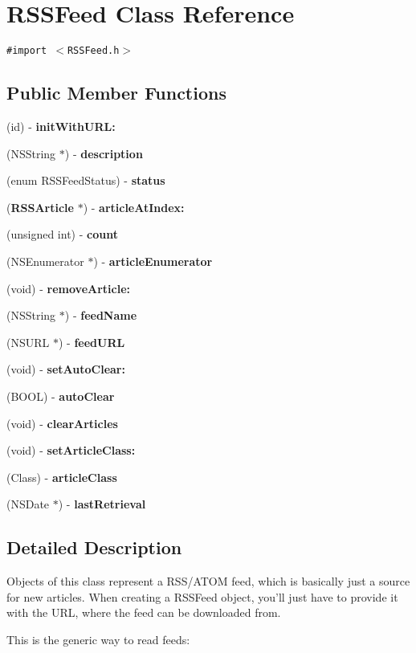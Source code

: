 \section{RSSFeed Class Reference}
\label{interfaceRSSFeed}
{\tt \#import $<$RSSFeed.h$>$}

\subsection*{Public Member Functions}
\begin{CompactItemize}
\item 
(id) - {\bf init\-With\-URL:}
\item 
(NSString $\ast$) - {\bf description}
\item 
(enum RSSFeed\-Status) - {\bf status}
\item 
({\bf RSSArticle} $\ast$) - {\bf article\-At\-Index:}
\item 
(unsigned int) - {\bf count}
\item 
(NSEnumerator $\ast$) - {\bf article\-Enumerator}
\item 
(void) - {\bf remove\-Article:}
\item 
(NSString $\ast$) - {\bf feed\-Name}
\item 
(NSURL $\ast$) - {\bf feed\-URL}
\item 
(void) - {\bf set\-Auto\-Clear:}
\item 
(BOOL) - {\bf auto\-Clear}
\item 
(void) - {\bf clear\-Articles}
\item 
(void) - {\bf set\-Article\-Class:}
\item 
(Class) - {\bf article\-Class}
\item 
(NSDate $\ast$) - {\bf last\-Retrieval}
\end{CompactItemize}


\subsection{Detailed Description}
Objects of this class represent a RSS/ATOM feed, which is basically just a source for new articles. When creating a RSSFeed object, you'll just have to provide it with the URL, where the feed can be downloaded from.

This is the generic way to read feeds:

